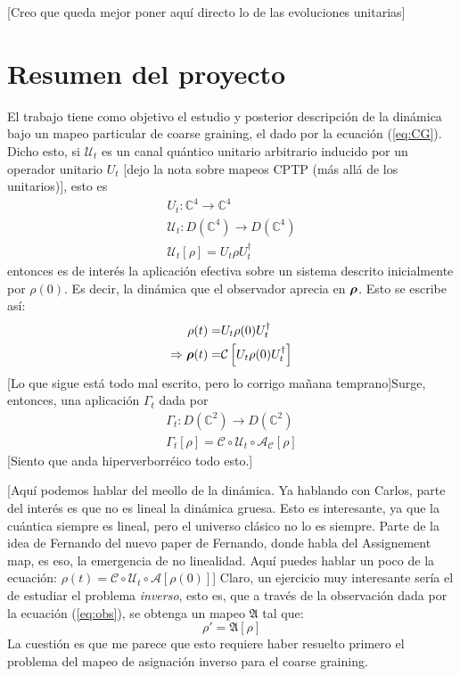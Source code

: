 \documentclass[onecolumn,11pt]{article}
\newcommand{\mcU}{\mathcal{U}}
\newcommand{\mcC}{\mathcal{C}}
\newcommand{\mcA}{\mathcal{A}}
\newcommand{\Cc}{\mathcal{C}} %
\newcommand{\Hh}{\mathbb{C}} %
\newcommand{\CG}[1]{\Cc\left[#1\right]}
\newcommand*{\B}[1]{\ifmmode\bm{#1}\else\textbf{#1}\fi}
\newcommand{\nota}[1]{{\color{red} [#1]}}
\newcommand{\notaAd}[1]{{\color{blue} [#1]}} %
\begin{document}
\notaAd{Creo que queda mejor poner aquí directo lo de las evoluciones unitarias}
\vspace{0.5cm}
\section{Resumen del proyecto}

El trabajo tiene como objetivo el estudio y posterior descripción de la dinámica bajo un mapeo particular de coarse graining, el dado por la ecuación (\ref{eq:CG}). Dicho esto, si $\mcU_{t}$ es un canal quántico unitario arbitrario inducido por un operador unitario $U_{t}$ \notaAd{dejo la nota sobre mapeos CPTP (más allá de los unitarios)}, esto es
\begin{gather}
U_{t}:\Hh^{4} \rightarrow \Hh^{4} \label{eq:UnitOpDyn}\\
\mcU_{t}:D(\Hh^{4})\rightarrow D(\Hh^{4}) \label{eq:UnitChaDyn}\\
\mcU_{t}[\rho]=U_{t}\rho U_{t}^{\dag}
\end{gather}
entonces es de interés la aplicación efectiva sobre un sistema descrito inicialmente por $\rho(0)$. Es decir, la dinámica que el observador aprecia en $\B{\rho}$. Esto se escribe así:
\begin{align}
    \rho(t)=&U_{t}\rho(0)U_{t}^{\dag}\\
    \Rightarrow \B{\rho}(t)=&\CG{U_{t}\rho(0) U_{t}^{\dag}}
\end{align}
\notaAd{Lo que sigue está todo mal escrito, pero lo corrigo mañana temprano}Surge, entonces, una aplicación $\Gamma_{t}$ dada por
\begin{gather}
\Gamma_{t}:D(\Hh^{2})\rightarrow D(\Hh^{2})\label{eq:GammaDom}\\
\Gamma_{t}[\rho]=\Cc\circ\mcU_{t}\circ\mcA_{\Cc}[\rho]\label{eq:Gamma}
\end{gather}
\notaAd{Siento que anda hiperverborréico todo esto.}


\nota{Aquí podemos hablar del meollo de la dinámica. Ya hablando con Carlos, parte del interés es que no es lineal la dinámica gruesa. Esto es interesante, ya que la cuántica siempre es lineal, pero el universo clásico no lo es siempre. Parte de la idea de Fernando del nuevo paper de Fernando, donde habla del Assignement map, es eso, la emergencia de no linealidad. Aquí puedes hablar un poco de la ecuación: $\rho(t)=\mcC \circ \mcU_t \circ \mcA [\rho(0)]$} Claro, un ejercicio muy interesante sería el de estudiar el problema \textit{inverso}, esto es, que a través de la observación dada por la ecuación (\ref{eq:obs}), se obtenga un mapeo $\mathfrak{A}$ tal que:
\begin{equation}
    \rho'=\mathfrak{A}\left[\rho\right]
\end{equation}
La cuestión es que me parece que esto requiere haber resuelto primero el problema del mapeo de asignación inverso para el coarse graining.
\end{document}
